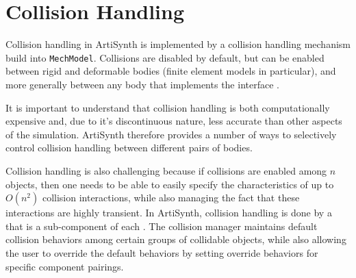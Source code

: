 




\section{Collision Handling}
\label{sec:mechii:collisions}

Collision handling in ArtiSynth is implemented by a collision
handling mechanism build into {\tt MechModel}. Collisions are
disabled by default, but can be enabled between rigid and deformable
bodies (finite element models in particular), and more generally
between any body that implements the interface 
.

It is important to understand that collision handling is both
computationally expensive and, due to it's discontinuous nature, less
accurate than other aspects of the simulation.  ArtiSynth therefore
provides a number of ways to selectively control collision handling
between different pairs of bodies.

Collision handling is also challenging because if collisions are
enabled among $n$ objects, then one needs to be able to easily specify
the characteristics of up to $O(n^2)$ collision interactions, while
also managing the fact that these interactions are highly transient.
In ArtiSynth, collision handling is done by a
 that is a
sub-component of each
.  The collision
manager maintains default collision behaviors among certain groups of
collidable objects, while also allowing the user to override the
default behaviors by setting override behaviors for specific component
pairings.

